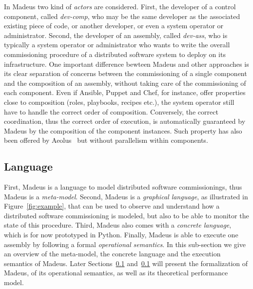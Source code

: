 In Madeus two kind of \emph{actors} are considered. First, the
developer of a control component, called \emph{dev-comp}, who may be
the same developer as the associated existing piece of code, or
another developer, or even a system operator or administrator. Second,
the developer of an assembly, called \emph{dev-ass}, who is typically
 a system operator or administrator
who wants to write the overall commissioning procedure of a
distributed software system to deploy on its infrastructure. One
important difference bewteen Madeus and other approaches is its clear
separation of concerns between the commissioning of a single component
and the composition of an assembly, without taking care of the
commissioning of each component. Even if Ansible, Puppet and Chef, for
instance, offer properties close to composition (\eg roles, playbooks,
recipes etc.), the system operator still have to handle the correct
order of composition. Conversely, the correct coordination, thus the
correct order of execution, is automatically guaranteed by Madeus by
the composition of the component instances. Such property has also
been offered by Aeolus~\cite{} but without parallelism within
components.

\subsection{Language}


First, Madeus is a language to model distributed software
commissionings, thus Madeus is a \emph{meta-model}. Second, Madeus is
a \emph{graphical language}, as illustrated in
Figure~\ref{fig:example}, that can be used to observe and understand
how a distributed software commissioning is modeled, but also to be
able to monitor the state of this procedure. Third, Madeus also comes
with a \emph{concrete language}, which is for now prototyped in
Python. Finally, Madeus is able to execute one assembly by following a
formal \emph{operational semantics}. In this sub-section we give an
overview of the meta-model, the concrete language and the execution
semantics of Madeus. Later Sections~\ref{} and~\ref{} will present the
formalization of Madeus, of its operational semantics, as well as its
theoretical performance model.




